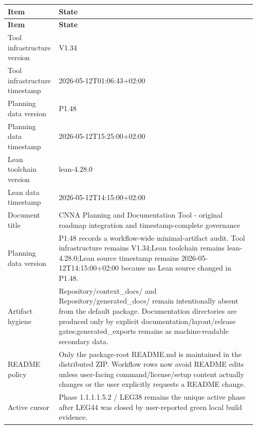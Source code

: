 \small
{}
\begin{longtable}{L{0.18\linewidth} L{0.78\linewidth}}
\hline
\textbf{Item} & \textbf{State}\\
\hline
\endfirsthead
\hline
\textbf{Item} & \textbf{State}\\
\hline
\endhead
Tool infrastructure version & V1.34\\
\hline
\addlinespace[0.24em]
Tool infrastructure timestamp & 2026-05-12T01:06:43+02:00\\
\hline
\addlinespace[0.24em]
Planning data version & P1.48\\
\hline
\addlinespace[0.24em]
Planning data timestamp & 2026-05-12T15:25:00+02:00\\
\hline
\addlinespace[0.24em]
Lean toolchain version & lean-4.28.0\\
\hline
\addlinespace[0.24em]
Lean data timestamp & 2026-05-12T14:15:00+02:00\\
\hline
\addlinespace[0.24em]
Document title & CNNA Planning and Documentation Tool - original roadmap integration and timestamp-complete governance\\
\hline
\addlinespace[0.24em]
Planning data version & P1.48 records a workflow-wide minimal-artifact audit. Tool infrastructure remains V1.34;\newline Lean toolchain remains lean-4.28.0;\newline Lean source timestamp remains 2026-05-12T14:15:00+02:00 because no Lean source changed in P1.48.\\
\hline
\addlinespace[0.24em]
Artifact hygiene & Repository/\allowbreak{}context\_docs/\allowbreak{} and Repository/\allowbreak{}generated\_docs/\allowbreak{} remain intentionally absent from the default package. Documentation directories are produced only by explicit documentation/\allowbreak{}layout/\allowbreak{}release gates;\newline generated\_exports remains as machine-readable secondary data.\\
\hline
\addlinespace[0.24em]
README policy & Only the package-root README.md is maintained in the distributed ZIP. Workflow rows now avoid README edits unless user-facing command/\allowbreak{}license/\allowbreak{}setup content actually changes or the user explicitly requests a README change.\\
\hline
\addlinespace[0.24em]
Active cursor & Phase 1.1.1.1.5.2 /\allowbreak{} LEG38 remains the unique active phase after LEG44 was closed by user-reported green local build evidence.\\

\end{longtable}

